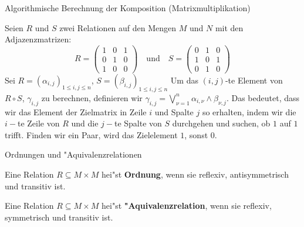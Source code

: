 \documentclass{beamer}
\begin{document}
\begin{frame}{Algorithmische Berechnung der Komposition (Matrixmultiplikation)}
  
  \begin{example}
    Seien $R$ und $S$ zwei Relationen auf den Mengen $M$ und $N$ mit den Adjazenzmatrizen:
    \[
    R = \begin{pmatrix}
      1 & 0 & 1 \\
      0 & 1 & 0 \\
      1 & 0 & 0
    \end{pmatrix}
    \quad \text{und} \quad
    S = \begin{pmatrix}
      0 & 1 & 0 \\
      1 & 0 & 1 \\
      0 & 1 & 0
    \end{pmatrix}
    \]
    Sei $R=(\alpha_{i,j})_{1\leq i,j\leq n}$, $S=(\beta_{i,j})_{1\leq i,j\leq n}$
    Um das $(i,j)$-te Element von $R\circ S$, $\gamma_{i,j}$ zu berechnen, definieren wir $\gamma_{i,j}=\bigvee_{\nu=1}^n \alpha_{i,\nu}\wedge\beta_{\nu,j}$.
    Das bedeutet, dass wir das Element der Zielmatrix in Zeile $i$ und Spalte $j$ so erhalten, indem wir die $i-$te Zeile von $R$ und die $j-$te Spalte von $S$ durchgehen und suchen, ob $1$ auf $1$ trifft. Finden wir ein Paar, wird das Zielelement $1$, sonst $0$.
    
  \end{example}
\end{frame}


\begin{frame}{Ordnungen und "Aquivalenzrelationen}
  \begin{definition}[Ordnung]
    Eine Relation $R\subseteq M\times M$ hei"st \textbf{Ordnung}, wenn sie reflexiv, antisymmetrisch und transitiv ist.
  \end{definition}
  \begin{definition}["Aquivalenzrelation]
    Eine Relation $R\subseteq M\times M$ hei"st \textbf{"Aquivalenzrelation}, wenn sie reflexiv, symmetrisch und transitiv ist.
  \end{definition}
\end{frame}
\end{document}
